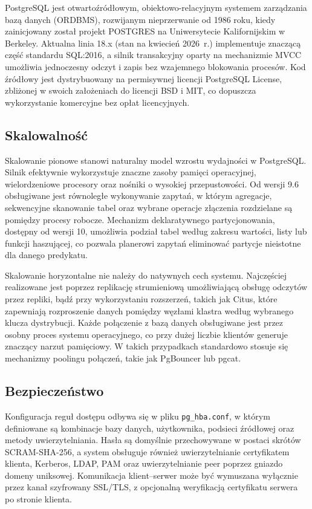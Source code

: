 PostgreSQL jest otwartoźródłowym, obiektowo-relacyjnym systemem zarządzania
bazą danych (ORDBMS), rozwijanym nieprzerwanie od 1986 roku, kiedy zainicjowany
został projekt POSTGRES na Uniwersytecie Kalifornijskim w Berkeley. Aktualna
linia 18.x (stan na kwiecień 2026~r.) implementuje znaczącą część standardu
SQL:2016, a silnik transakcyjny oparty na mechanizmie MVCC umożliwia jednoczesny
odczyt i zapis bez wzajemnego blokowania procesów. Kod źródłowy jest dystrybuowany
na permisywnej licencji PostgreSQL License, zbliżonej w swoich założeniach do
licencji BSD i MIT, co dopuszcza wykorzystanie komercyjne bez opłat licencyjnych.

\subsection{Skalowalność}

Skalowanie pionowe stanowi naturalny model wzrostu wydajności w PostgreSQL.
Silnik efektywnie wykorzystuje znaczne zasoby pamięci operacyjnej, wielordzeniowe
procesory oraz nośniki o wysokiej przepustowości. Od wersji 9.6 obsługiwane jest
równoległe wykonywanie zapytań, w którym agregacje, sekwencyjne skanowanie
tabel oraz wybrane operacje złączenia rozdzielane są pomiędzy procesy robocze.
Mechanizm deklaratywnego partycjonowania, dostępny od wersji 10, umożliwia
podział tabel według zakresu wartości, listy lub funkcji haszującej, co pozwala
planerowi zapytań eliminować partycje nieistotne dla danego predykatu.

Skalowanie horyzontalne nie należy do natywnych cech systemu. Najczęściej
realizowane jest poprzez replikację strumieniową umożliwiającą obsługę odczytów
przez repliki, bądź przy wykorzystaniu rozszerzeń, takich jak Citus, które
zapewniają rozproszenie danych pomiędzy węzłami klastra według wybranego klucza
dystrybucji. Każde połączenie z bazą danych obsługiwane jest przez osobny
proces systemu operacyjnego, co przy dużej liczbie klientów generuje znaczący
narzut pamięciowy. W takich przypadkach standardowo stosuje się mechanizmy
poolingu połączeń, takie jak PgBouncer lub pgcat.

\subsection{Bezpieczeństwo}

Konfiguracja reguł dostępu odbywa się w pliku \texttt{pg\_hba.conf}, w którym
definiowane są kombinacje bazy danych, użytkownika, podsieci źródłowej oraz
metody uwierzytelniania. Hasła są domyślnie przechowywane w postaci skrótów
SCRAM-SHA-256, a system obsługuje również uwierzytelnianie certyfikatem
klienta, Kerberos, LDAP, PAM oraz uwierzytelnianie peer poprzez gniazdo
domeny uniksowej. Komunikacja klient–serwer może być wymuszana wyłącznie
przez kanał szyfrowany SSL/TLS, z opcjonalną weryfikacją certyfikatu serwera
po stronie klienta.

